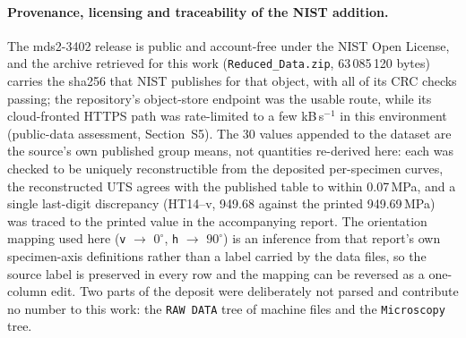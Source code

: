 \documentclass[12pt,a4paper,twocolumn]{article}
\providecommand{\ang}[1]{\ensuremath{#1^{\circ}}}
\begin{document}
\paragraph{Provenance, licensing and traceability of the NIST addition.} The mds2-3402 release is public and
account-free under the NIST Open License, and the archive retrieved for this work (\texttt{Reduced\_Data.zip},
63\,085\,120 bytes) carries the sha256 that NIST publishes for that object, with all of its CRC checks passing;
the repository's object-store endpoint was the usable route, while its cloud-fronted HTTPS path was rate-limited
to a few kB\,s$^{-1}$ in this environment (public-data assessment, Section~S5). The 30 values appended to the
dataset are the source's own published group means, not quantities re-derived here: each was checked to be uniquely
reconstructible from the deposited per-specimen curves, the reconstructed UTS agrees with the published table to
within 0.07\,MPa, and a single last-digit discrepancy (HT14--v, 949.68 against the printed 949.69\,MPa) was traced
to the printed value in the accompanying report. The orientation mapping used here (\texttt{v} $\rightarrow$
$\ang{0}$, \texttt{h} $\rightarrow$ $\ang{90}$) is an inference from that report's own specimen-axis definitions
rather than a label carried by the data files, so the source label is preserved in every row and the mapping can
be reversed as a one-column edit. Two parts of the deposit were deliberately not parsed and contribute no number to
this work: the \texttt{RAW DATA} tree of machine files and the \texttt{Microscopy} tree.
\end{document}
